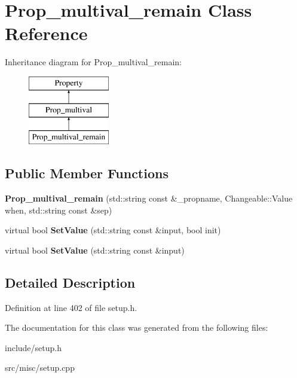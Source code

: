 \hypertarget{classProp__multival__remain}{\section{Prop\-\_\-multival\-\_\-remain Class Reference}
\label{classProp__multival__remain}
}
Inheritance diagram for Prop\-\_\-multival\-\_\-remain\-:\begin{figure}[H]
\begin{center}
\leavevmode
\includegraphics[height=3.000000cm]{classProp__multival__remain}
\end{center}
\end{figure}
\subsection*{Public Member Functions}
\begin{DoxyCompactItemize}
\item 
\hypertarget{classProp__multival__remain_a59450ef7be09d83d29831c5c378d79ad}{{\bfseries Prop\-\_\-multival\-\_\-remain} (std\-::string const \&\-\_\-propname, Changeable\-::\-Value when, std\-::string const \&sep)}\label{classProp__multival__remain_a59450ef7be09d83d29831c5c378d79ad}

\item 
\hypertarget{classProp__multival__remain_a73ff08a986693c879b330654de3152cc}{virtual bool {\bfseries Set\-Value} (std\-::string const \&input, bool init)}\label{classProp__multival__remain_a73ff08a986693c879b330654de3152cc}

\item 
\hypertarget{classProp__multival__remain_ac6f943a59a58acf45efe4c0ee51f3948}{virtual bool {\bfseries Set\-Value} (std\-::string const \&input)}\label{classProp__multival__remain_ac6f943a59a58acf45efe4c0ee51f3948}

\end{DoxyCompactItemize}


\subsection{Detailed Description}


Definition at line 402 of file setup.\-h.



The documentation for this class was generated from the following files\-:\begin{DoxyCompactItemize}
\item 
include/setup.\-h\item 
src/misc/setup.\-cpp\end{DoxyCompactItemize}
